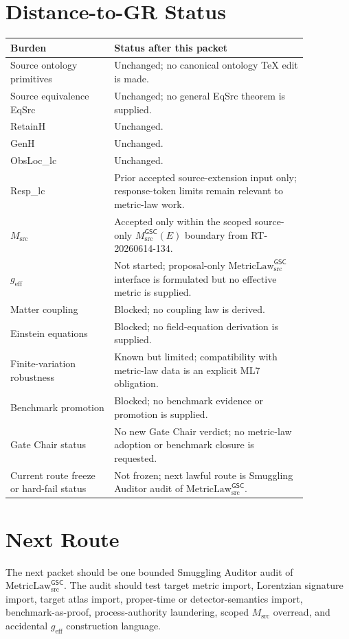 \documentclass[11pt]{article}
\newcommand{\Msrc}{M_{\mathrm{src}}}
\newcommand{\MsrcGSC}{M_{\mathrm{src}}^{\mathsf{GSC}}}
\newcommand{\MetricLaw}{\mathrm{MetricLaw}_{\mathrm{src}}^{\mathsf{GSC}}}
\newcommand{\geff}{g_{\mathrm{eff}}}
\begin{document}
\section{Distance-to-GR Status}

\begin{longtable}{p{0.30\linewidth}p{0.56\linewidth}}
\toprule
Burden & Status after this packet \\
\midrule
Source ontology primitives & Unchanged; no canonical ontology TeX edit is made. \\
Source equivalence EqSrc & Unchanged; no general EqSrc theorem is supplied. \\
RetainH & Unchanged. \\
GenH & Unchanged. \\
ObsLoc\_lc & Unchanged. \\
Resp\_lc & Prior accepted source-extension input only; response-token limits remain relevant to metric-law work. \\
\(\Msrc\) & Accepted only within the scoped source-only \(\MsrcGSC(E)\) boundary from RT-20260614-134. \\
\(\geff\) & Not started; proposal-only \(\MetricLaw\) interface is formulated but no effective metric is supplied. \\
Matter coupling & Blocked; no coupling law is derived. \\
Einstein equations & Blocked; no field-equation derivation is supplied. \\
Finite-variation robustness & Known but limited; compatibility with metric-law data is an explicit ML7 obligation. \\
Benchmark promotion & Blocked; no benchmark evidence or promotion is supplied. \\
Gate Chair status & No new Gate Chair verdict; no metric-law adoption or benchmark closure is requested. \\
Current route freeze or hard-fail status & Not frozen; next lawful route is Smuggling Auditor audit of \(\MetricLaw\). \\
\bottomrule
\end{longtable}

\section{Next Route}

The next packet should be one bounded Smuggling Auditor audit of
\(\MetricLaw\). The audit should test target metric import, Lorentzian
signature import, target atlas import, proper-time or detector-semantics
import, benchmark-as-proof, process-authority laundering, scoped \(\Msrc\)
overread, and accidental \(\geff\) construction language.
\end{document}
